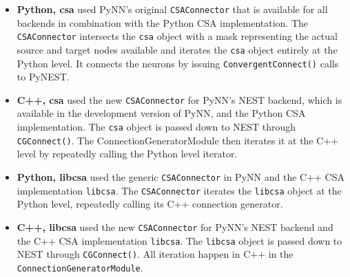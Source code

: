 \documentclass{frontiersSCNS} %
\begin{document}
\begin{itemize}
\item \textbf{Python, csa} used PyNN's original \verb|CSAConnector|
  that is available for all backends in combination with the Python
  CSA implementation. The \verb|CSAConnector| intersects the
  \verb|csa| object with a mask representing the actual source and
  target nodes available and iterates the \verb|csa| object entirely
  at the Python level. It connects the neurons by issuing
  \verb|ConvergentConnect()| calls to PyNEST.
\item \textbf{C++, csa} used the new \verb|CSAConnector| for PyNN's
  NEST backend, which is available in the development version of PyNN,
  and the Python CSA implementation. The \verb|csa| object is passed
  down to NEST through \verb|CGConnect()|. The
  ConnectionGeneratorModule then iterates it at the C++ level by
  repeatedly calling the Python level iterator.
\item \textbf{Python, libcsa} used the generic \verb|CSAConnector| in
  PyNN and the C++ CSA implementation \verb|libcsa|. The
  \verb|CSAConnector| iterates the \verb|libcsa| object at the Python
  level, repeatedly calling its C++ connection generator.
\item \textbf{C++, libcsa} used the new \verb|CSAConnector| for PyNN's
  NEST backend and the C++ CSA implementation \verb|libcsa|. The
  \verb|libcsa| object is passed down to NEST through
  \verb|CGConnect()|. All iteration happen in C++ in the
  \verb|ConnectionGeneratorModule|.
\end{itemize}
\end{document}

